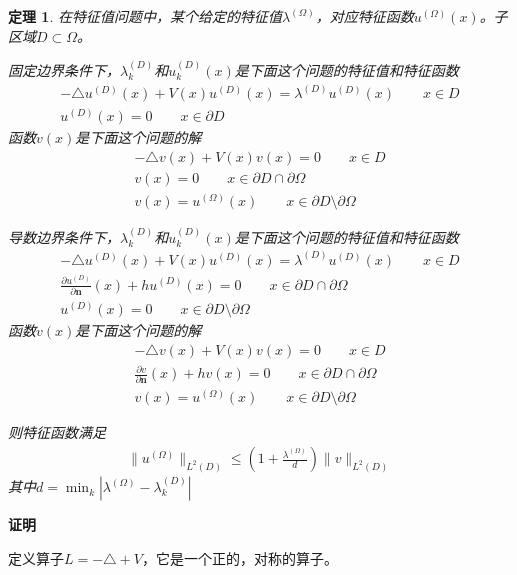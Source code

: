 \documentclass[12pt,a4paper]{article}
\newtheorem{theorem}{定理}
\begin{document}
\begin{theorem}

在特征值问题中，某个给定的特征值$\lambda^{(\Omega)}$，对应特征函数$u^{(\Omega)}(x)$。子区域$D \subset \Omega$。

固定边界条件下，$\lambda_k^{(D)}$和$u_k^{(D)}(x)$是下面这个问题的特征值和特征函数
\begin{align}
-\triangle u^{(D)}(x) + V(x) u^{(D)}(x) = \lambda^{(D)} u^{(D)}(x) \qquad x \in D \\
u^{(D)}(x) = 0 \qquad x \in \partial D
\end{align}
函数$v(x)$是下面这个问题的解
\begin{align}
-\triangle v(x) + V(x) v(x) = 0 \qquad x \in D \\
v(x) = 0 \qquad x \in \partial D \cap \partial \Omega \\
v(x) = u^{(\Omega)}(x) \qquad x \in \partial D \setminus \partial \Omega
\end{align}

导数边界条件下，$\lambda_k^{(D)}$和$u_k^{(D)}(x)$是下面这个问题的特征值和特征函数
\begin{align}
-\triangle u^{(D)}(x) + V(x) u^{(D)}(x) = \lambda^{(D)} u^{(D)}(x) \qquad x \in D \\
\frac{\partial u^{(D)}}{\partial \mathbf{n}}(x) + h u^{(D)}(x) = 0 \qquad x \in \partial D \cap \partial \Omega \\
u^{(D)}(x) = 0 \qquad x \in \partial D \setminus \partial \Omega
\end{align}
函数$v(x)$是下面这个问题的解
\begin{align}
-\triangle v(x) + V(x) v(x) = 0 \qquad x \in D \\
\frac{\partial v}{\partial \mathbf{n}}(x) + h v(x) = 0 \qquad x \in \partial D \cap \partial \Omega \\
v(x) = u^{(\Omega)}(x) \qquad x \in \partial D \setminus \partial \Omega
\end{align}

则特征函数满足
\begin{align}
\|u^{(\Omega)}\|_{L^2(D)} \leq (1 + \frac{\lambda^{(\Omega)}}{d}) \|v\|_{L^2(D)}
\end{align}
其中$d = \min_k |\lambda^{(\Omega)} - \lambda_k^{(D)}|$

\end{theorem}

\textbf{证明}

定义算子$L = -\triangle + V$，它是一个正的，对称的算子。
\end{document}
